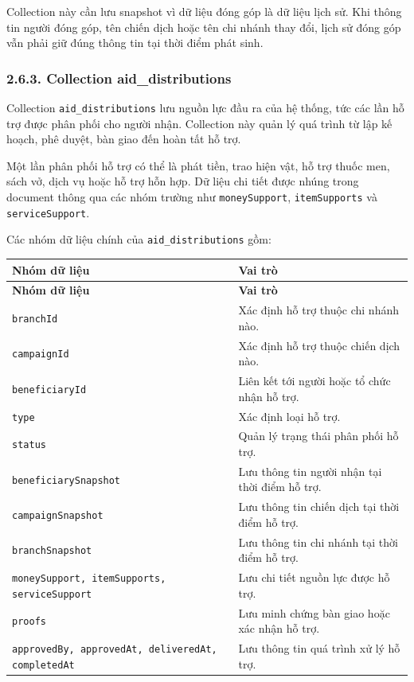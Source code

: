 \documentclass[12pt,a4paper]{article}
\begin{document}
Collection này cần lưu snapshot vì dữ liệu đóng góp là dữ liệu lịch sử. Khi thông tin người đóng góp, tên chiến dịch hoặc tên chi nhánh thay đổi, lịch sử đóng góp vẫn phải giữ đúng thông tin tại thời điểm phát sinh.

\subsubsection*{2.6.3. Collection aid\_distributions}

Collection \texttt{aid\_distributions} lưu nguồn lực đầu ra của hệ thống, tức các lần hỗ trợ được phân phối cho người nhận. Collection này quản lý quá trình từ lập kế hoạch, phê duyệt, bàn giao đến hoàn tất hỗ trợ.

Một lần phân phối hỗ trợ có thể là phát tiền, trao hiện vật, hỗ trợ thuốc men, sách vở, dịch vụ hoặc hỗ trợ hỗn hợp. Dữ liệu chi tiết được nhúng trong document thông qua các nhóm trường như \texttt{moneySupport}, \texttt{itemSupports} và \texttt{serviceSupport}.

Các nhóm dữ liệu chính của \texttt{aid\_distributions} gồm:

\begin{center}
\small
\begin{longtable}{|p{4cm}|p{8.5cm}|}
\hline
\textbf{Nhóm dữ liệu} & \textbf{Vai trò} \\ \hline
\endfirsthead
\hline
\textbf{Nhóm dữ liệu} & \textbf{Vai trò} \\ \hline
\endhead
\texttt{branchId} & Xác định hỗ trợ thuộc chi nhánh nào. \\ \hline
\texttt{campaignId} & Xác định hỗ trợ thuộc chiến dịch nào. \\ \hline
\texttt{beneficiaryId} & Liên kết tới người hoặc tổ chức nhận hỗ trợ. \\ \hline
\texttt{type} & Xác định loại hỗ trợ. \\ \hline
\texttt{status} & Quản lý trạng thái phân phối hỗ trợ. \\ \hline
\texttt{beneficiarySnapshot} & Lưu thông tin người nhận tại thời điểm hỗ trợ. \\ \hline
\texttt{campaignSnapshot} & Lưu thông tin chiến dịch tại thời điểm hỗ trợ. \\ \hline
\texttt{branchSnapshot} & Lưu thông tin chi nhánh tại thời điểm hỗ trợ. \\ \hline
\texttt{moneySupport, itemSupports, serviceSupport} & Lưu chi tiết nguồn lực được hỗ trợ. \\ \hline
\texttt{proofs} & Lưu minh chứng bàn giao hoặc xác nhận hỗ trợ. \\ \hline
\texttt{approvedBy, approvedAt, deliveredAt, completedAt} & Lưu thông tin quá trình xử lý hỗ trợ. \\ \hline
\end{longtable}
\normalsize
\end{center}
\end{document}
